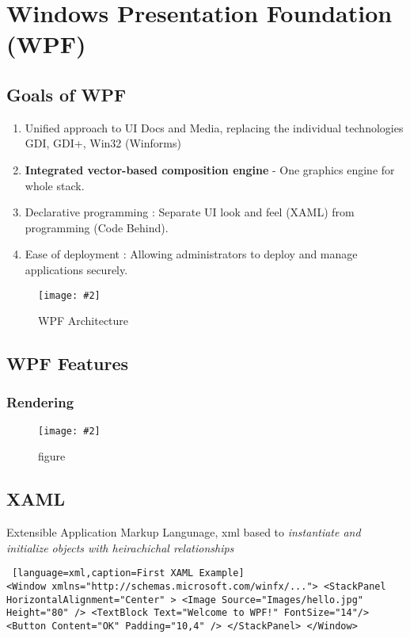 \documentclass[a4paper,10pt]{scrreprt}
\newcommand{\pic}[2][figure]{\begin{figure}[h]
 \centering
 \texttt{[image: \#2]}
 \caption{#1}
\end{figure}
}
\begin{document}
\chapter{Windows Presentation Foundation (WPF)}

\section{Goals of WPF}
\begin{enumerate}
\item Unified approach to UI Docs and Media, replacing the individual technologies GDI, GDI+, Win32 (Winforms)
\item \textbf{Integrated vector-based composition engine} - One graphics engine for whole stack.
\item Declarative programming : Separate UI look and feel (XAML) from programming (Code Behind).
\item Ease of deployment : Allowing administrators to deploy and manage applications securely.
\end{enumerate}

\pic[WPF Architecture]{wpfArchitecture.PNG}

\section{WPF Features}
\subsection{Rendering}
\pic{wrender.png}

\section{XAML}
Extensible Application Markup Langunage, xml based to \textit{instantiate and initialize objects with heirachichal relationships}

\begin{lstlisting} [language=xml,caption=First XAML Example]
<Window xmlns="http://schemas.microsoft.com/winfx/..."> <StackPanel HorizontalAlignment="Center" > <Image Source="Images/hello.jpg" Height="80" /> <TextBlock Text="Welcome to WPF!" FontSize="14"/> <Button Content="OK" Padding="10,4" /> </StackPanel> </Window>
\end{lstlisting}
\end{document}

